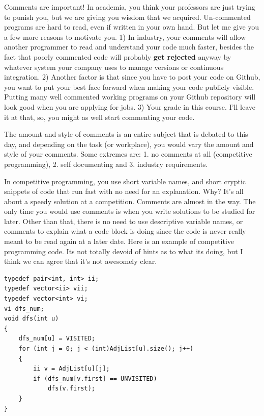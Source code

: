 \newpage
{}

Comments are important! In academia, you think your professors are just trying to punish you, but we are giving you wisdom that we acquired. Un-commented programs are hard to read, even if written in your own hand. But let me give you a few more reasons to motivate you. 1) In industry, your comments will allow another programmer to read and understand your code much faster, besides the fact that poorly commented code will probably \textbf{get rejected} anyway by whatever system your company uses to manage versions or continuous integration. 2) Another factor is that since you have to post your code on Github, you want to put your best face forward when making your code publicly visible. Putting many well commented working programs on your Github repository will look good when you are applying for jobs. 3) Your grade in this course. I'll leave it at that, so, you might as well start commenting your code.\\



The amount and style of comments is an entire subject that is debated to this day, and depending on the task (or workplace), you would vary the amount and style of your comments. Some extremes are: 1. no comments at all (competitive programming), 2. self documenting and 3. industry requirements. 


In competitive programming, you use short variable names, and short cryptic snippets of code that run fast with no need for an explanation. Why? It's all about a speedy solution at a competition. Comments are almost in the way. The only time you would use comments is when you write solutions to be studied for later. Other than that, there is no need to use descriptive variable names, or comments to explain what a code block is doing since the code is never really meant to be read again at a later date. Here is an example of competitive programming code. Its not totally devoid of hints as to what its doing, but I think we can agree that it's not awesomely clear.

\begin{verbatim}
typedef pair<int, int> ii;
typedef vector<ii> vii;
typedef vector<int> vi;
vi dfs_num;
void dfs(int u)
{
    dfs_num[u] = VISITED;
    for (int j = 0; j < (int)AdjList[u].size(); j++)
    {
        ii v = AdjList[u][j];
        if (dfs_num[v.first] == UNVISITED)
            dfs(v.first);
    }
}
\end{verbatim}

